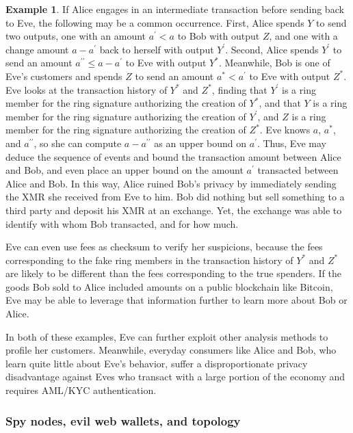 \documentclass{article}
\theoremstyle{definition}
\newtheorem{example}{Example}
\begin{document}
\begin{example}
If Alice engages in an intermediate transaction before sending back to Eve, the following may be a common occurrence.
First, Alice spends $Y$ to send two outputs, one with an amount $a^\prime < a$ to Bob with output $Z$, and one with a change amount $a - a^\prime$ back to herself with output $Y^\prime$.
Second, Alice spends $Y^\prime$ to send an amount $a^{\prime \prime} \leq a - a^\prime$ to Eve with output $Y^*$.
Meanwhile, Bob is one of Eve's customers and spends $Z$ to send an amount $a^* < a^\prime$ to Eve with output $Z^*$.
Eve looks at the transaction history of $Y^*$ and $Z^*$, finding that $Y^\prime$ is a ring member for the ring signature authorizing the creation of $Y^*$, and that $Y$ is a ring member for the ring signature authorizing the creation of $Y^\prime$, and $Z$ is a ring member for the ring signature authorizing the creation of $Z^*$.
Eve knows $a$, $a^*$, and $a^{\prime \prime}$, so she can compute $a - a^{\prime \prime}$ as an upper bound on $a^\prime$.
Thus, Eve may deduce the sequence of events and bound the transaction amount between Alice and Bob, and even place an upper bound on the amount $a^\prime$ transacted between Alice and Bob.
In this way, Alice ruined Bob's privacy by immediately sending the XMR she received from Eve to him.
Bob did nothing but sell something to a third party and deposit his XMR at an exchange.
Yet, the exchange was able to identify with whom Bob transacted, and for how much.

Eve can even use fees as checksum to verify her suspicions, because the fees corresponding to the fake ring members in the transaction history of $Y^*$ and $Z^*$ are likely to be different than the fees corresponding to the true spenders.
If the goods Bob sold to Alice included amounts on a public blockchain like Bitcoin, Eve may be able to leverage that information further to learn more about Bob or Alice.
\end{example}

In both of these examples, Eve can further exploit other analysis methods to profile her customers.
Meanwhile, everyday consumers like Alice and Bob, who learn quite little about Eve's behavior, suffer a disproportionate privacy disadvantage against Eves who transact with a large portion of the economy and requires AML/KYC authentication.


\subsubsection{Spy nodes, evil web wallets, and topology}
\end{document}
